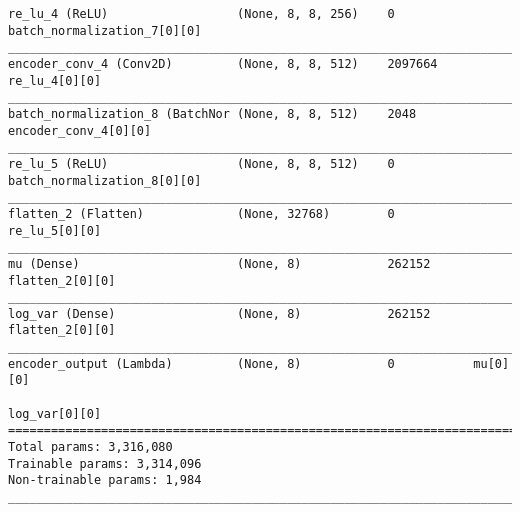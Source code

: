 \begin{lstlisting}[caption={CelebA-\ac{VAE}-\ac{GAN} Encoder},captionpos=b,basicstyle=\tiny, label={lst:mnist-vae-encoder}]
re_lu_4 (ReLU)                  (None, 8, 8, 256)    0           batch_normalization_7[0][0]
__________________________________________________________________________________________________
encoder_conv_4 (Conv2D)         (None, 8, 8, 512)    2097664     re_lu_4[0][0]
__________________________________________________________________________________________________
batch_normalization_8 (BatchNor (None, 8, 8, 512)    2048        encoder_conv_4[0][0]
__________________________________________________________________________________________________
re_lu_5 (ReLU)                  (None, 8, 8, 512)    0           batch_normalization_8[0][0]
__________________________________________________________________________________________________
flatten_2 (Flatten)             (None, 32768)        0           re_lu_5[0][0]
__________________________________________________________________________________________________
mu (Dense)                      (None, 8)            262152      flatten_2[0][0]
__________________________________________________________________________________________________
log_var (Dense)                 (None, 8)            262152      flatten_2[0][0]
__________________________________________________________________________________________________
encoder_output (Lambda)         (None, 8)            0           mu[0][0]
                                                                 log_var[0][0]
==================================================================================================
Total params: 3,316,080
Trainable params: 3,314,096
Non-trainable params: 1,984
__________________________________________________________________________________________________
\end{lstlisting}